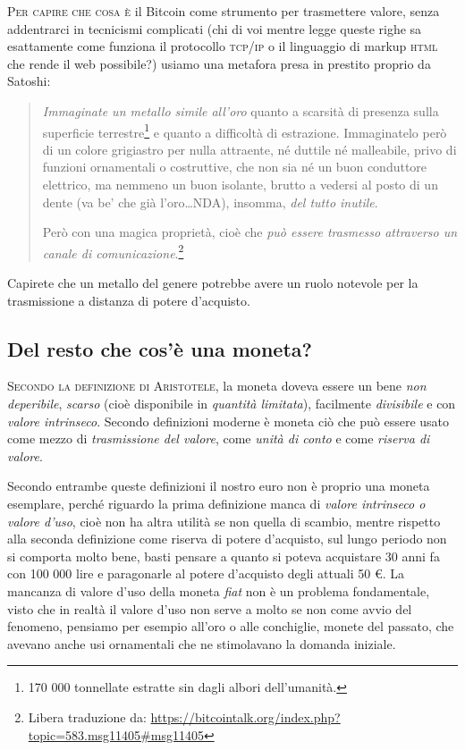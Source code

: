 \documentclass[a4paper,12pt,italian]{article}
\begin{document}
\lettrine{P}{er capire che cosa è} il Bitcoin come strumento per trasmettere valore,
senza addentrarci in tecnicismi complicati (chi di voi mentre legge
queste righe sa esattamente come funziona il protocollo \textsc{tcp/ip} o il
linguaggio di markup \textsc{html} che rende il web possibile?) usiamo una
metafora presa in prestito proprio da Satoshi:

\begin{quotation}
\noindent
\emph{Immaginate un metallo simile all’oro} quanto a scarsità di presenza
sulla superficie terrestre\footnote{170 000 tonnellate estratte sin dagli
albori dell’umanità.} e quanto a difficoltà di estrazione. Immaginatelo
però di un colore grigiastro per nulla attraente, né duttile né
malleabile, privo di funzioni ornamentali o costruttive, che non sia né un buon
conduttore elettrico, ma nemmeno un buon isolante, brutto a
vedersi al posto di un dente (va be' che già
l'oro\ldots NDA), insomma, \emph{del tutto inutile}.

\smallskip

\noindent
Però con una magica proprietà, cioè che \emph{può essere trasmesso 
attraverso un canale di comunicazione}.\footnote{Libera traduzione da:
\url{https://bitcointalk.org/index.php?topic=583.msg11405\#msg11405}}
\end{quotation} 


\bigskip

Capirete che un metallo del genere potrebbe avere un ruolo notevole per
la trasmissione a distanza di potere d’acquisto.

\subsection*{Del resto che cos’è una moneta?}

\lettrine{S}{econdo la definizione di Aristotele}, la moneta doveva essere un
bene \emph{non deperibile}, \emph{scarso} (cioè disponibile in \emph{quantità limitata}),
facilmente \emph{divisibile} e con \emph{valore intrinseco}.
Secondo definizioni moderne è moneta ciò che può essere usato come
mezzo di \emph{trasmissione del valore}, come \emph{unità di conto} e come \emph{riserva di
valore}. 

\smallskip

Secondo entrambe queste definizioni il nostro euro non è
proprio una moneta esemplare, perché riguardo la prima definizione
manca di \emph{valore intrinseco o valore d’uso}, cioè non ha altra utilità se non quella di
scambio, mentre rispetto alla seconda definizione come riserva di
potere d’acquisto, sul lungo periodo non si comporta molto bene, basti
pensare a quanto si poteva acquistare 30 anni fa con 100 000 lire e
paragonarle al potere d’acquisto degli attuali 50 €. La mancanza di
valore d’uso della moneta \emph{fiat} non è un problema fondamentale, visto
che in realtà il valore d’uso non serve a molto se non come avvio del
fenomeno, pensiamo per esempio all’oro o alle conchiglie, monete del
passato, che avevano anche usi ornamentali che ne stimolavano la
domanda iniziale.
\end{document}
